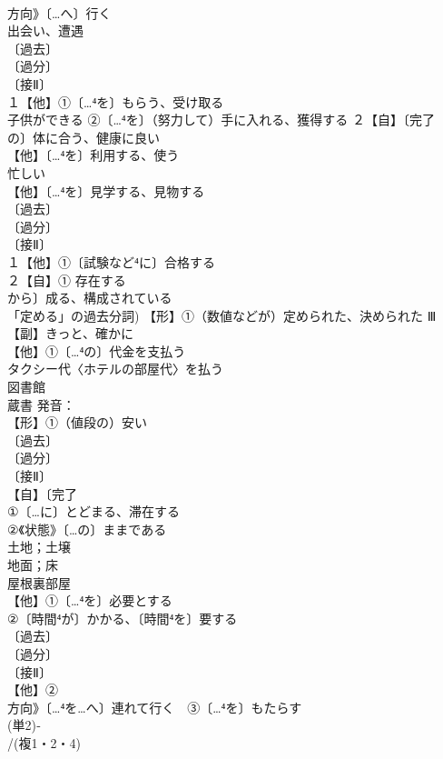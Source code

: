\documentclass[8pt]{extreport}
\begin{document}
\begin{CJK}{UTF8}{min}
\\	方向》〔…へ〕行く 
\\	出会い、遭遇
\\	〔過去〕
\\	〔過分〕
\\	〔接Ⅱ〕
\\	１【他】①〔…⁴を〕もらう、受け取る
\\	子供ができる ②〔…⁴を〕（努力して）手に入れる、獲得する ２【自】〔完了
\\	の〕体に合う、健康に良い 
\\	【他】〔…⁴を〕利用する、使う
\\	忙しい
\\	【他】〔…⁴を〕見学する、見物する
\\	〔過去〕
\\	〔過分〕
\\	〔接Ⅱ〕
\\	１【他】①〔試験など⁴に〕合格する
\\	２【自】① 存在する　
\\	から〕成る、構成されている 
\\	「定める」の過去分詞) 【形】①（数値などが）定められた、決められた Ⅲ【副】きっと、確かに 
\\	【他】①〔…⁴の〕代金を支払う
\\	タクシー代〈ホテルの部屋代〉を払う
\\	図書館
\\	蔵書 発音：
\\	【形】①（値段の）安い 
\\	〔過去〕
\\	〔過分〕
\\	〔接Ⅱ〕
\\	【自】〔完了
\\	①〔…に〕とどまる、滞在する 
\\	②《状態》〔…の〕ままである
\\	土地；土壌 
\\	地面；床 
\\	屋根裏部屋
\\	【他】①〔…⁴を〕必要とする
\\	②〔時間⁴が〕かかる、〔時間⁴を〕要する 
\\	〔過去〕
\\	〔過分〕
\\	〔接Ⅱ〕
\\	【他】②
\\	方向》〔…⁴を…へ〕連れて行く　③〔…⁴を〕もたらす 
\\	(単2)‐
\\	/(複1・2・4)

\end{CJK}
\end{document}
